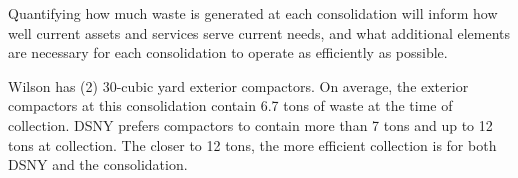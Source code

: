 
    Quantifying how much waste is generated at each consolidation will inform how well current assets and services serve current needs, and what additional elements are necessary for each consolidation to operate as efficiently as possible.
    
    Wilson has (2) 30-cubic yard exterior compactors. On average, the exterior compactors at this consolidation contain 6.7 tons of waste at the time of collection. DSNY prefers compactors to contain more than 7 tons and up to 12 tons at collection. The closer to 12 tons, the more efficient collection is for both DSNY and the consolidation.
